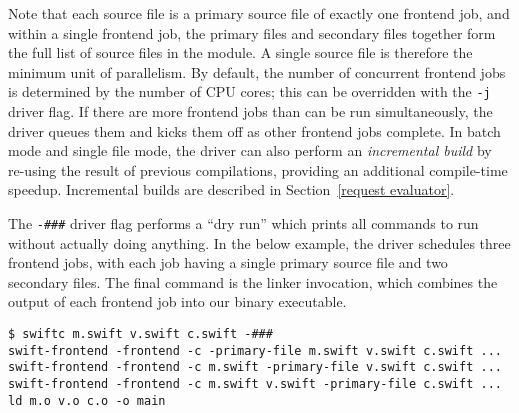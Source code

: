 \documentclass[../generics]{subfiles}
\begin{document}
Note that each source file is a primary source file of exactly one frontend job, and within a single frontend job, the primary files and secondary files together form the full list of source files in the module. A single source file is therefore the minimum unit of parallelism. By default, the number of concurrent frontend jobs is determined by the number of CPU cores; this can be overridden with the \texttt{-j} driver flag. If there are more frontend jobs than can be run simultaneously, the driver queues them and kicks them off as other frontend jobs complete. In batch mode and single file mode, the driver can also perform an \emph{incremental build} by re-using the result of previous compilations, providing an additional compile-time speedup. Incremental builds are described in Section~\ref{request evaluator}.

The \verb|-###| driver flag performs a ``dry run'' which prints all commands to run without actually doing anything. In the below example, the driver schedules three frontend jobs, with each job having a single primary source file and two secondary files. The final command is the linker invocation, which combines the output of each frontend job into our binary executable.
\begin{Verbatim}
$ swiftc m.swift v.swift c.swift -###
swift-frontend -frontend -c -primary-file m.swift v.swift c.swift ...
swift-frontend -frontend -c m.swift -primary-file v.swift c.swift ...
swift-frontend -frontend -c m.swift v.swift -primary-file c.swift ...
ld m.o v.o c.o -o main
\end{Verbatim}
\end{document}
